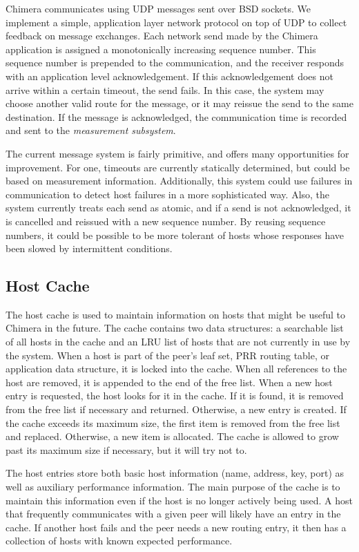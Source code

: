 Chimera communicates using UDP messages sent over BSD sockets. We implement
a simple, application layer network protocol on top of UDP to collect
feedback on message exchanges. Each network send made by the Chimera application
is assigned a monotonically increasing sequence number. This sequence number is
prepended to the communication, and the receiver responds with an application
level acknowledgement. If this acknowledgement does not arrive within a
certain timeout, the send fails.
In this case, the system may choose another valid route for the message, or it
may reissue the send to the same destination.
If the message is acknowledged, the communication time is recorded and sent
to the {\em measurement subsystem}.

The current message system is fairly primitive, and offers many opportunities
for improvement. For one, timeouts are currently statically determined, but could
be based on measurement information. Additionally,
this system could use failures in communication to detect host failures in
a more sophisticated way. Also, the
system currently treats each send as atomic, and if a send is not acknowledged,
it is cancelled and reissued with a new sequence number. By reusing sequence
numbers, it could be possible to be more tolerant of hosts whose responses
have been slowed by intermittent conditions.

\subsection{Host Cache}
\label{cache}

The host cache is used to maintain information on hosts that might be
useful to Chimera in the future.
The cache contains two data structures: a searchable list of all
hosts in the cache and an LRU list of hosts that are not currently in
use by the system. When a host is part of the peer's leaf set, PRR
routing table, or application data structure, it is locked into the
cache. When all references to the host are removed, it is appended to the
end of the free list. When a new host entry is requested, the host looks
for it in the cache. If it is found, it is removed from the free list if
necessary and returned. Otherwise, a new entry is created. If the cache exceeds
its maximum size, the first item is removed from the free list and replaced.
Otherwise, a new item is allocated. The cache is allowed to grow past its
maximum size if necessary, but it will try not to.

The host entries store both basic host information (name, address, key, port)
as well as auxiliary performance information. The main purpose of the
cache is to maintain this information even if the host is no longer actively
being used. A host that frequently communicates with a given peer will
likely have an entry in the cache. If another host fails and the peer needs
a new routing entry, it then has a collection of hosts with known expected
performance.

